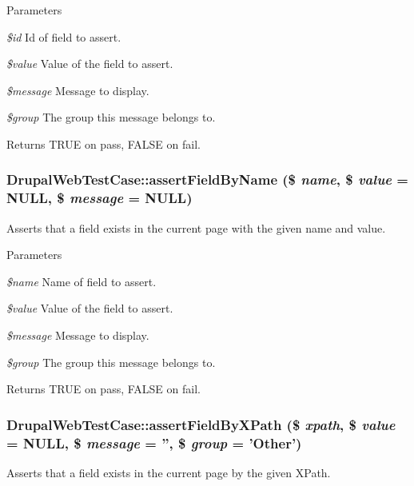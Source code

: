 \begin{DoxyParams}{Parameters}
\item[{\em \$id}]Id of field to assert. \item[{\em \$value}]Value of the field to assert. \item[{\em \$message}]Message to display. \item[{\em \$group}]The group this message belongs to. \end{DoxyParams}
\begin{DoxyReturn}{Returns}
TRUE on pass, FALSE on fail. 
\end{DoxyReturn}
\hypertarget{classDrupalWebTestCase_a7d75feaa5c363f5b346dfcff53f226b5}{
\subsubsection[{assertFieldByName}]{\setlength{\rightskip}{0pt plus 5cm}DrupalWebTestCase::assertFieldByName (\$ {\em name}, \/  \$ {\em value} = {\ttfamily NULL}, \/  \$ {\em message} = {\ttfamily NULL})}}
\label{classDrupalWebTestCase_a7d75feaa5c363f5b346dfcff53f226b5}
Asserts that a field exists in the current page with the given name and value.


\begin{DoxyParams}{Parameters}
\item[{\em \$name}]Name of field to assert. \item[{\em \$value}]Value of the field to assert. \item[{\em \$message}]Message to display. \item[{\em \$group}]The group this message belongs to. \end{DoxyParams}
\begin{DoxyReturn}{Returns}
TRUE on pass, FALSE on fail. 
\end{DoxyReturn}
\hypertarget{classDrupalWebTestCase_a870dded2b4059ee7e6827dad6d4bf650}{
\subsubsection[{assertFieldByXPath}]{\setlength{\rightskip}{0pt plus 5cm}DrupalWebTestCase::assertFieldByXPath (\$ {\em xpath}, \/  \$ {\em value} = {\ttfamily NULL}, \/  \$ {\em message} = {\ttfamily ''}, \/  \$ {\em group} = {\ttfamily 'Other'})}}
\label{classDrupalWebTestCase_a870dded2b4059ee7e6827dad6d4bf650}
Asserts that a field exists in the current page by the given XPath.


